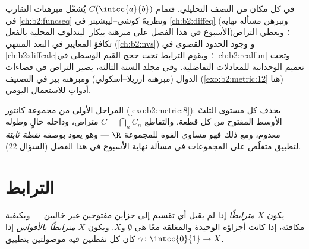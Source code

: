 \begin{remark}
في كل مكان من النصف التحليلي. فتمام
$C(\intcc{a}{b})$ يُشغّل مبرهنات التقارب في
\cref{ch:b2:funcseq} ونظريةَ كوشي--ليبشيتز في
\cref{ch:b2:diffeq} (وتبرهن مسألة نهاية الأسبوع في هذا الفصل على
مبرهنة بيكار--ليندلوف المحلية بالفعل)؛ ويعطي التراص
تكافؤ المعايير في البعد المنتهي (\cref{ch:b2:nvs}) و
وجود الحدود القصوى في \cref{ch:b2:diffcalc}؛ ويقوم الترابط
تحت حجج القيم الوسطى في \cref{ch:b2:realfun}
وتحت تعميم الوحدانية للمعادلات التفاضلية. وفي
مجلد السنة الثالثة، يصير التراص في فضاءات الدوال
(مبرهنة أرزيلا--أسكولي) ومبرهنة بير في التصنيف
(\cref{exo:b2:metric:12} هنا) أدواتٍ للاستعمال اليومي.
\end{remark}

\begin{omfigure}

{\small المراحل الأولى من مجموعة كانتور
(\cref{exo:b2:metric:8}): يحذف كل مستوى الثلثَ الأوسط المفتوح
من كل قطعة. والتقاطع $C = \bigcap_n C_n$
متراص، وداخله خالٍ وطوله معدوم، ومع ذلك فهو مساوي القوة
للمجموعة $\R$ --- وهو يعود بوصفه \emph{نقطة ثابتة} لتطبيق
متقلّص على المجموعات في مسألة نهاية الأسبوع في هذا الفصل (السؤال
22).}
\end{omfigure}

\section{الترابط}

\begin{definition}\label{def:b2:metric:connected}
يكون $X$ \emph{مترابطًا} إذا لم يقبل أي
تقسيم إلى جزأين مفتوحين غير خاليين --- وبكيفية مكافئة، إذا كانت
أجزاؤه الوحيدة  والمغلقة معًا هي $\emptyset$ و$X$. ويكون $X$
\emph{مترابطًا بالأقواس} إذا كان كل نقطتين فيه موصولتين بتطبيق 
$\gamma \colon \intcc{0}{1} \to X$.
\end{definition}

